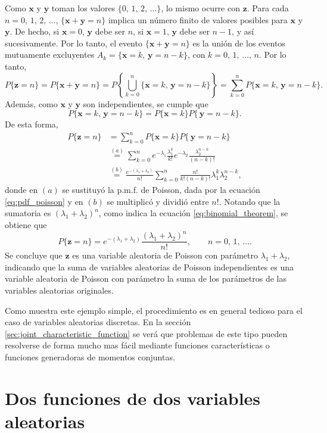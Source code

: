 \documentclass[a4paper]{report}
\newcommand{\x}{\mathbf{x}}
\newcommand{\y}{\mathbf{y}}
\newcommand{\z}{\mathbf{z}}
\begin{document}
Como \(\x\) y \(\y\) toman los valores \(\{0,\,1,\,2,\,\dots\}\), lo mismo ocurre con \(\z\). Para cada \(n=0,\,1,\,2,\,\dots\), \(\{\x+\y=n\}\) implica un número finito de valores posibles para \(\x\) y \(\y\). De hecho, si \(\x=0\), \(\y\) debe ser \(n\), si \(\x=1\), \(\y\) debe ser \(n-1\), y así sucesivamente. Por lo tanto, el evento \(\{\x+\y=n\}\) es la unión de los eventos mutuamente excluyentes \(A_k=\{\x=k,\,\y=n-k\}\), con \(k=0,\,1,\,\dots,\,n\). Por lo tanto,
\[
 P\{\z=n\}=P\{\x+\y=n\}=P\left\{\bigcup_{k=0}^n\{\x=k,\,\y=n-k\}\right\}
  =\sum_{k=0}^nP\{\x=k,\,\y=n-k\}.
\]
Además, como \(\x\) y \(\y\) son independientes, se cumple que 
\[
 P\{\x=k,\,\y=n-k\}=P\{\x=k\}P\{\,\y=n-k\}.
\]
De esta forma,
\begin{align*}
 P\{\z=n\}&=\sum_{k=0}^nP\{\x=k\}P\{\,\y=n-k\}\\
  &\overset{(a)}{=}\sum_{k=0}^ne^{-\lambda_1}\frac{\lambda_1^k}{k!}e^{-\lambda_2}\frac{\lambda_2^{n-k}}{(n-k)!}\\
  &\overset{(b)}{=}\frac{e^{-(\lambda_1+\lambda_2)}}{n!}\sum_{k=0}^n\frac{n!}{k!(n-k)!}\lambda_1^k\lambda_2^{n-k},
\end{align*}
donde en \((a)\) se sustituyó la p.m.f. de Poisson, dada por la ecuación \ref{eq:pdf_poisson} y en \((b)\) se multiplicó y dividió entre \(n!\). Notando que la sumatoria es \((\lambda_1+\lambda_2)^n\), como indica la ecuación \ref{eq:binomial_theorem}, se obtiene que
\begin{equation}\label{eq:poisson_sum_pmf}
 P\{\z=n\}=e^{-(\lambda_1+\lambda_2)}\frac{(\lambda_1+\lambda_2)^n}{n!},\qquad n=0,\,1,\,\dots.
\end{equation}
Se concluye que \(\z\) es una variable aleatoria de Poisson con parámetro \(\lambda_1+\lambda_2\), indicando que la suma de variables aleatorias de Poisson independientes es una variable aleatoria de Poisson con parámetro la suma de los parámetros de las variables aleatorias originales.

Como muestra este ejemplo simple, el procedimiento es en general tedioso para el caso de variables aleatorias discretas. En la sección \ref{sec:joint_characteristic_function} se verá que problemas de este tipo pueden resolverse de forma mucho mas fácil mediante funciones características o funciones generadoras de momentos conjuntas. 

\section{Dos funciones de dos variables aleatorias}\label{sec:two_funcions_of_two_rv}
\end{document}
